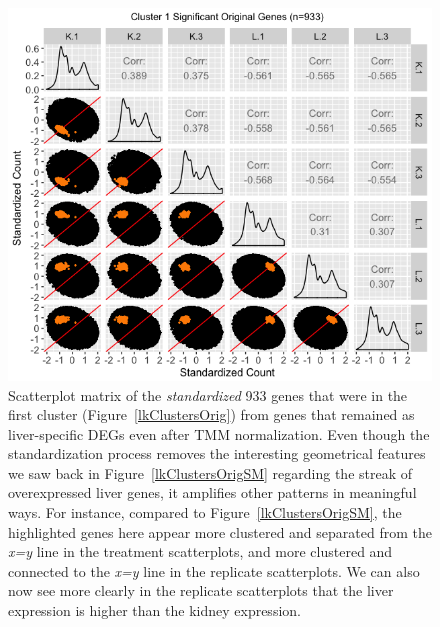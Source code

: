 \documentclass[11pt,a4paper,oldfontcommands,openany]{memoir}
\numberwithin{equation}{section} %
\begin{document}
\null
\begin{figure}[t!]
\begin{framed}
\centerline{\includegraphics[width=1\columnwidth]{MakeFigures/lkClustersOrigSM-St.jpg}}
\end{framed}
\caption{Scatterplot matrix of the \textit{standardized} 933 genes that were in the first cluster (Figure~\ref{lkClustersOrig}) from genes that remained as liver-specific DEGs even after TMM normalization. Even though the standardization process removes the interesting geometrical features we saw back in Figure~\ref{lkClustersOrigSM} regarding the streak of overexpressed liver genes, it amplifies other patterns in meaningful ways. For instance, compared to Figure~\ref{lkClustersOrigSM}, the highlighted genes here appear more clustered and separated from the \textit{x=y} line in the treatment scatterplots, and more clustered and connected to the \textit{x=y} line in the replicate scatterplots. We can also now see more clearly in the replicate scatterplots that the liver expression is higher than the kidney expression. 
\label{lkClustersOrigSM-St}}
\end{figure}
\end{document}
